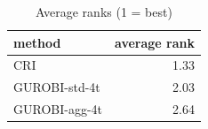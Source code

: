 \begin{table}[htbp]
\centering
\small
\caption{Average ranks (1 = best)}
\label{tab:E7_gurobi_threads_b10_ranks}
\begin{tabular}{lr}
\toprule
method & average rank \\
\midrule
CRI & 1.33 \\
GUROBI-std-4t & 2.03 \\
GUROBI-agg-4t & 2.64 \\
\bottomrule
\end{tabular}
\end{table}
